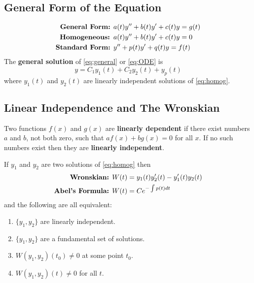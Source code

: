 \documentclass[10pt,leqno]{article}
\begin{document}
\begin{multicols}{2}

\subsection*{General Form of the Equation}
\begin{align} 
\text{{\textbf{General Form:} }}&
a(t)y''+b(t)y'+c(t)y=g(t) \label{eq:general}\\
\text{\textbf{{Homogeneous:} }}&
a(t)y''+b(t)y'+c(t)y=0\label{eq:homog}\\
\text{{\textbf{Standard Form:} }}&
y''+p(t)y'+q(t)y=f(t)
\label{eq:ODE}
\end{align}
The \textbf{general solution} of \eqref{eq:general} or \eqref{eq:ODE} is 
\begin{equation}
y = C_1 y_1(t) + C_2 y_2 (t) + y_p(t)
\end{equation}
where $y_1(t)$ and $y_2(t)$ are linearly independent solutions of \eqref{eq:homog}.

\subsection*{Linear Independence and The Wronskian}
Two functions $f(x)$ and $g(x)$ are \textbf{linearly dependent} if there exist numbers $a$ and $b$, not both zero, such that $af(x)+bg(x)=0$ for all $x$. If no such numbers exist then they are \textbf{linearly independent}.

If $y_1$ and $y_2$ are two solutions of \eqref{eq:homog} then 
\begin{align}
\text{\textbf{Wronskian:} } & W(t) = y_1(t) y_2'(t) - y_1'(t) y_2(t)\\
\text{\textbf{Abel's Formula:} }&W(t) = Ce^{-\int{p(t)dt}}
\end{align}
and the following are all equivalent: 
\begin{enumerate}
\item $\{y_1,y_2\}$ are linearly independent.
\item $\{y_1,y_2\}$ are a fundamental set of solutions.
\item $W(y_1, y_2)(t_0)\neq 0$ at some point $t_0$.
\item $W(y_1,y_2)(t) \neq 0$ for all $t$.
\end{enumerate}



\end{multicols}
\end{document}
